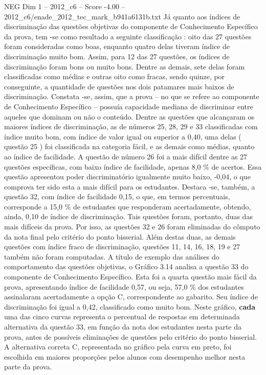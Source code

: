 \begin{textsample}{NEG Dim 1 – 2012\_c6 – Score -4.00 – 2012\_c6/enade\_2012\_tec\_mark\_b941a6131b.txt}
Já quanto aos índices de discriminação das questões objetivas do componente de Conhecimento Específico da prova, tem -se como resultado a seguinte classificação : oito das 27 questões foram consideradas como boas, enquanto quatro delas tiveram índice de discriminação muito bom.
Assim, para 12 das 27 questões, os índices de discriminação foram bons ou muito bons.
Dentre as demais, sete delas foram classificadas como médias e outras oito como fracas, sendo quinze, por conseguinte, a quantidade de questões nos dois patamares mais baixos de discriminação.
Constata -se, assim, que a prova – no que se refere ao componente de Conhecimento Específico – possuía capacidade mediana de discriminar entre aqueles que dominam ou não o conteúdo.
Dentre as questões que alcançaram os maiores índices de discriminação, as de números 25, 28, 29 e 33 classificadas com índice muito bom, com índice de valor igual ou superior a 0,40, uma delas ( questão 25 ) foi classificada na categoria fácil, e as demais como médias, quanto ao índice de facilidade.
A questão de número 26 foi a mais difícil dentre as 27 questões específicas, com baixo índice de facilidade, apenas 8,0 \% de acertos.
Essa questão apresentou poder discriminatório igualmente muito baixo, -0,04, o que comprova ter sido esta a mais difícil para os estudantes.
Destaca -se, também, a questão 32, com índice de facilidade 0,15, o que, em termos percentuais, corresponde a 15,0 \% de estudantes que responderam acertadamente, obtendo, ainda, 0,10 de índice de discriminação.
Tais questões foram, portanto, duas das mais difíceis da prova.
Por isso, as questões 32 e 26 foram eliminadas do cômputo da nota final pelo critério do ponto bisserial.
Além destas duas, as demais questões com índice fraco de discriminação, questões 11, 14, 16, 18, 19 e 27 também não foram computadas.
A título de exemplo das análises do comportamento das questões objetivas, o Gráfico 3.14 analisa a questão 33 do componente de Conhecimento Específico.
Esta foi a quarta questão mais fácil da prova, apresentando índice de facilidade 0,57, ou seja, 57,0 \% dos estudantes assinalaram acertadamente a opção C, correspondente ao gabarito.
Seu índice de discriminação foi igual a 0,42, classificado como muito bom.
Neste gráfico, \textbf{cada} uma das cinco curvas representa o percentual de respostas em determinada alternativa da questão 33, em função da nota dos estudantes nesta parte da prova, antes de possíveis eliminações de questões pelo critério do ponto bisserial.
A alternativa correta C, representada no gráfico pela curva em preto, foi escolhida em maiores proporções pelos alunos com desempenho melhor nesta parte da prova.

\end{textsample}

